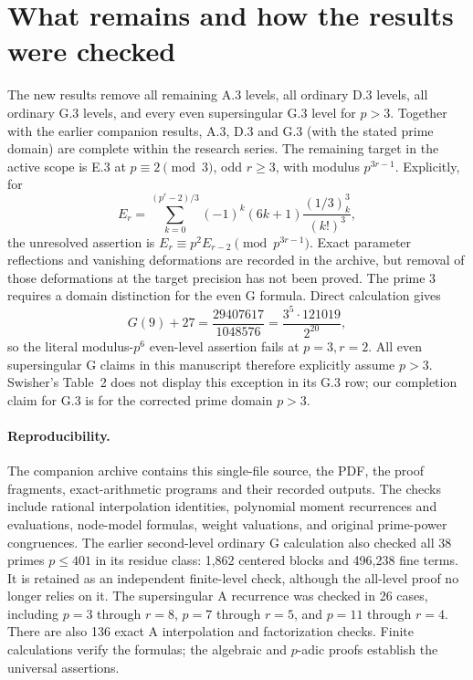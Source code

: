 \documentclass[11pt,letterpaper]{article}
\numberwithin{equation}{section}
\begin{document}
\section{What remains and how the results were checked}\label{loc-V-9}
The new results remove all remaining A.3 levels, all ordinary D.3
levels, all ordinary G.3 levels, and every even supersingular G.3
level for $p>3$. Together with the earlier companion results,
A.3, D.3 and G.3 (with the stated prime domain) are complete within
the research series. The remaining target in the active scope is
E.3 at $p\equiv2\pmod3$, odd $r\ge3$, with modulus $p^{3r-1}$.
Explicitly, for
\[
 E_r=\sum_{k=0}^{(p^r-2)/3}(-1)^k(6k+1)
 \frac{(1/3)_k^3}{(k!)^3},
\]
the unresolved assertion is
$E_r\equiv p^2E_{r-2}\pmod{p^{3r-1}}$.
Exact parameter reflections and vanishing deformations are
recorded in the archive, but removal of those deformations at
the target precision has not been proved.
The prime $3$ requires a domain distinction for the even G formula.
Direct calculation gives
\[
 G(9)+27=\frac{29407617}{1048576}
 =\frac{3^5\cdot121019}{2^{20}},
\]
so the literal modulus-$p^6$ even-level assertion fails at
$p=3,r=2$. All even supersingular G claims in this manuscript
therefore explicitly assume $p>3$.
Swisher's Table~2 does not display this exception in its G.3 row;
our completion claim for G.3 is for the corrected prime domain $p>3$.

\paragraph{Reproducibility.}
The companion archive contains this single-file source, the PDF,
the proof fragments, exact-arithmetic programs and their recorded
outputs. The checks include rational interpolation identities,
polynomial moment recurrences and evaluations, node-model formulas,
weight valuations, and original prime-power congruences.
The earlier second-level ordinary G calculation also checked all
38 primes $p\le401$ in its residue class: 1,862 centered blocks
and 496,238 fine terms. It is retained as an independent finite-level
check, although the all-level proof no longer relies on it.
The supersingular A recurrence was checked in 26 cases, including
$p=3$ through $r=8$, $p=7$ through $r=5$, and $p=11$ through $r=4$.
There are also 136 exact A interpolation and factorization checks.
Finite calculations verify the formulas; the algebraic and
$p$-adic proofs establish the universal assertions.
\end{document}
